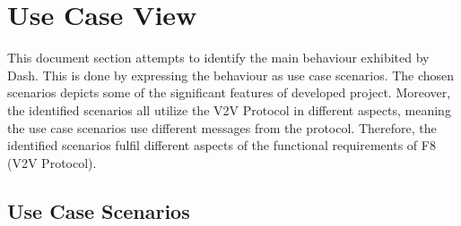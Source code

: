 \documentclass[12pt]{article}
\begin{document}
\section{Use Case View}
This document section attempts to identify the main behaviour exhibited by Dash. This is done by expressing the behaviour as use case scenarios. The chosen scenarios depicts some of the significant features of developed project. Moreover, the identified scenarios all utilize the V2V Protocol in different aspects, meaning the use case scenarios use different messages from the protocol. Therefore, the identified scenarios fulfil different aspects of the functional requirements of F8 (V2V Protocol). \par

\subsection{Use Case Scenarios}

\end{document}
